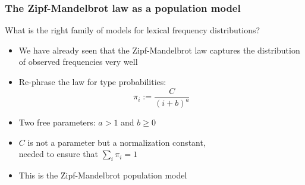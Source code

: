 \documentclass[handout,notes=show,t]{beamer} %
\begin{document}
\begin{frame}
  \frametitle{The Zipf-Mandelbrot law as a population model}

  What is the right family of models for lexical frequency distributions?
  \begin{itemize}
  \item We have already seen that the Zipf-Mandelbrot law captures the
    distribution of observed frequencies very well%
    \pause
  \item Re-phrase the law for type probabilities:
    \[ \pi_i := \frac{C}{(i + b) ^ a} \]
  \item Two free parameters: $a > 1$ and $b \geq 0$
  \item $C$ is not a parameter but a normalization constant,\\
    needed to ensure that $\sum_i \pi_i = 1$
  \item This is the \h{Zipf-Mandelbrot} population model
  \end{itemize}
\end{frame}
\end{document}
